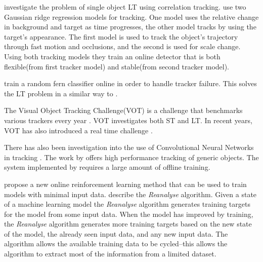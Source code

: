 \citeauthor{Ma2015Correlation} \cite{Ma2015Correlation} investigate the problem of single object LT using correlation tracking.
\citeauthor{Ma2015Correlation} use two Gaussian ridge regression \cite{murphy2012} models for tracking.
One model uses the relative change in background and target as time progresses, the other model tracks by using the target's appearance.
The first model is used to track the object's trajectory through fast motion and occlusions, and the second is used for scale change.
Using both tracking models they train an online detector that is both flexible(from first tracker model) and stable(from second tracker model).

\citeauthor{Ma2015Correlation} train a random fern classifier \cite{ferns2007} \cite{Kalal2011} online in order to handle tracker failure.
This solves the LT problem in a similar way to \citeauthor{KalalPHD}.

The Visual Object Tracking Challenge(VOT) is a challenge that benchmarks various trackers every year \cite{VOT2017} \cite{VOT2020}.
VOT investigates both ST and LT.
In recent years, VOT has also introduced a real time challenge \cite{VOT2020}.

There has also been investigation into the use of Convolutional Neural Networks in tracking \cite{CNNTracking}.
The work by \citeauthor{CNNTracking} offers high performance tracking of generic objects.
The system implemented by \citeauthor{CNNTracking} requires a large amount of offline training.

\citeauthor{onlineRL} \cite{onlineRL} propose a new online reinforcement learning method that can be used to train models with minimal input data.
\citeauthor{onlineRL} describe the \textit{Reanalyse} algorithm.
Given a state of a machine learning model the \textit{Reanalyse} algorithm generates training targets for the model from some input data.
When the model has improved by training, the \textit{Reanalyse} algorithm generates more training targets based on the new state of the model, the already seen input data, and any new input data.
The algorithm allows the available training data to be cycled--this allows the algorithm to extract most of the information from a limited dataset.
